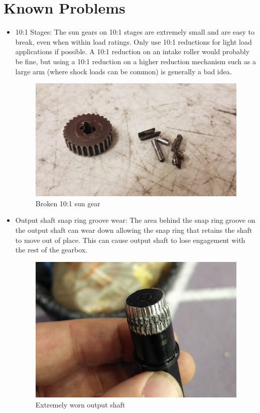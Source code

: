 \documentclass[12pt, letterpaper]{article}
\begin{document}
\section{Known Problems}
\begin{itemize}
    \item 10:1 Stages:
    \newline The sun gears on 10:1 stages are extremely small and are easy to break, even when within load ratings. Only use 10:1 reductions for light load applications if possible. A 10:1 reduction on an intake roller would probably be fine, but using a 10:1 reduction on a higher reduction mechanism such as a large arm (where shock loads can be common) is generally a bad idea.

    \begin{figure}[h!]
        \centering
        \includegraphics[scale = 0.0625]{broken versa 2.jpeg}
        \caption{Broken 10:1 sun gear}
    \end{figure}
    
    \item Output shaft snap ring groove wear: 
    \newline The area behind the snap ring groove on the output shaft can wear down allowing the snap ring that retains the shaft to move out of place. This can cause output shaft to lose engagement with the rest of the gearbox.

    \begin{figure}[h!]
        \centering
        \includegraphics[scale = 0.5]{stripped output.jpeg}
        \caption{Extremely worn output shaft}
    \end{figure}


\end{itemize}
\end{document}
